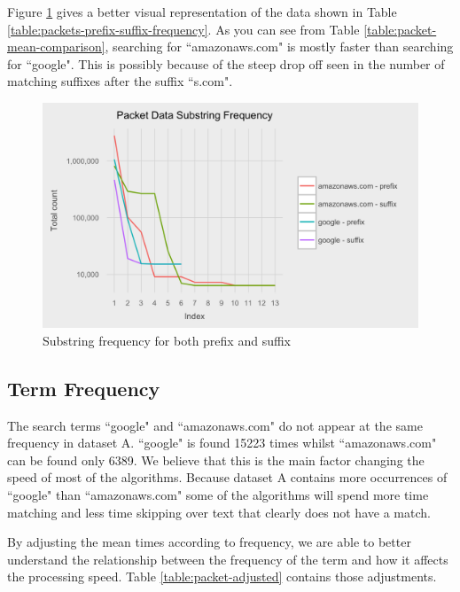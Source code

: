 \documentclass{article}
\begin{document}
Figure \ref{fig:packet-substring-frequency} gives a better visual representation of the data shown in Table \ref{table:packets-prefix-suffix-frequency}. As you can see from Table \ref{table:packet-mean-comparison}, searching for ``amazonaws.com" is mostly faster than searching for ``google". This is possibly because of the steep drop off seen in the number of matching suffixes after the suffix ``s.com".

\begin{figure}[h!bt]
  \centering
  \includegraphics[width=\textwidth]{graphs/substring_frequency.png}
  \caption{Substring frequency for both prefix and suffix}
  \label{fig:packet-substring-frequency}
\end{figure}

\subsection{Term Frequency}

The search terms ``google" and ``amazonaws.com" do not appear at the same frequency in dataset A. ``google" is found 15223 times whilst ``amazonaws.com" can be found only 6389. We believe that this is the main factor changing the speed of most of the algorithms. Because dataset A contains more occurrences of ``google" than ``amazonaws.com" some of the algorithms will spend more time matching and less time skipping over text that clearly does not have a match.

By adjusting the mean times according to frequency, we are able to better understand the relationship between the frequency of the term and how it affects the processing speed. Table \ref{table:packet-adjusted} contains those adjustments.
\end{document}

